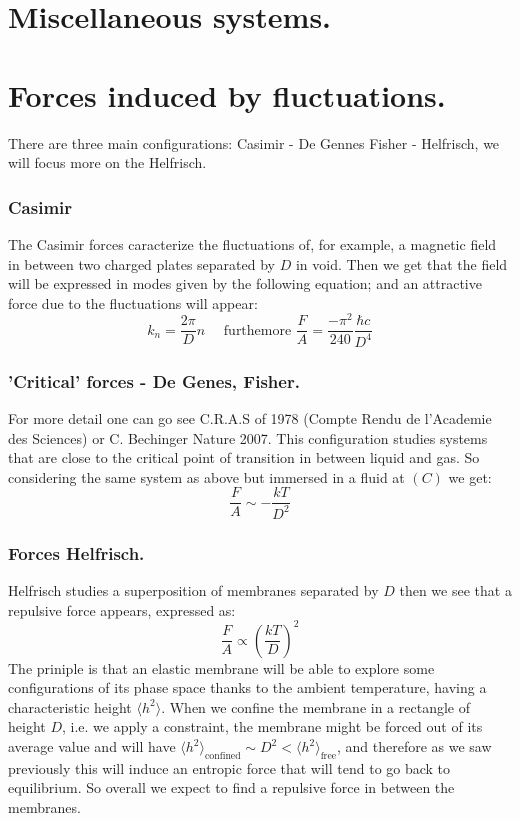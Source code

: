 \documentclass[10pt,a4paper]{book}
\begin{document}
\section{Miscellaneous systems.}
\section{Forces induced by fluctuations.}
There are three main configurations: Casimir - De Gennes Fisher - Helfrisch, we will focus more on the Helfrisch.
\subsubsection{Casimir}
The Casimir forces caracterize the fluctuations of, for example, a magnetic field in between two charged plates separated by $D$ in void. Then we get that the field will be expressed in modes given by the following equation; and an attractive force due to the fluctuations will appear:
\[
k_n = \frac{2\pi}{D} n \quad \text{ furthemore } \frac{F}{A} = \frac{-\pi^2}{240}\frac{\hbar c}{D^4}
\]
\subsubsection{'Critical' forces - De Genes, Fisher.}
For more detail one can go see C.R.A.S of 1978 (Compte Rendu de l'Academie des Sciences) or C. Bechinger Nature 2007. This configuration studies systems that are close to the critical point of transition in between liquid and gas. So considering the same system as above but immersed in a fluid at $(C)$ we get:
\[
\frac{F}{A} \sim - \frac{kT}{D^2}
\]
\subsubsection{Forces Helfrisch.}
Helfrisch studies a superposition of membranes separated by $D$ then we see that a repulsive force appears, expressed as:
\[
\frac{F}{A} \propto \left(\frac{kT}{D}\right)^2
\]
The priniple is that an elastic membrane will be able to explore some configurations of its phase space thanks to the ambient temperature, having a characteristic height $\langle h^2 \rangle$. When we confine the membrane in a rectangle of height $D$, i.e. we apply a constraint, the membrane might be forced out of its average value and will have $\langle h^2 \rangle_\text{confined} \sim D^2 < \langle h^2 \rangle_\text{free}$, and therefore as we saw previously this will induce an entropic force that will tend to go back to equilibrium. So overall we expect to find a repulsive force in between the membranes.
\end{document}

